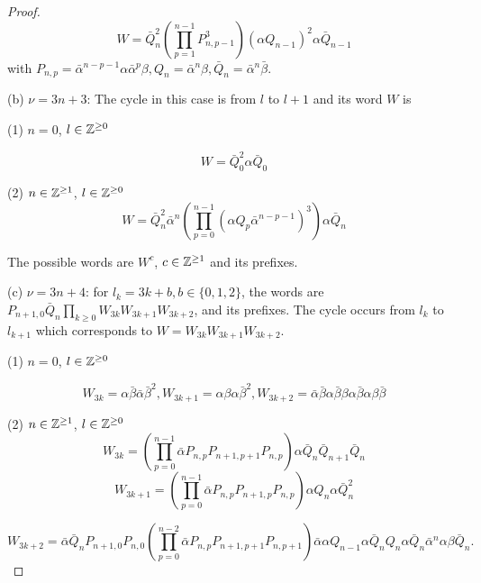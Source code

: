 \documentclass{birkjour_t2}
\theoremstyle{definition}
\theoremstyle{remark}
\numberwithin{equation}{section}
\begin{document}
\begin{proof}
  \begin{equation} 
 W=\bar{Q}_{n}^{2}\left(\prod^{n-1} _{p=1}P_{n, p-1}^{3}\right) (\alpha Q_{n-1})^{2} \alpha \bar{Q}_{n-1}
           \end{equation} 
with $P_{n,p}=\bar{\alpha}^{n-p-1}\alpha \bar{\alpha}^{p} \beta, Q_{n}= \bar{\alpha}^{n}\beta, \bar{Q}_{n}= \bar{\alpha}^{n}\bar{\beta}$.
     \bigskip\par 
 
(b) $\nu= 3n+3$: The cycle in this case is from $l$ to $l+1$ and its word $W$ is 
      \bigskip\par 
(1) $n =0$, $l \in  {\Bbb{Z}}^{\geq 0}$

      \begin{equation} 
W=  \bar{Q}_{0}^{2}  \alpha \bar{Q}_{0}
          \end{equation}  

(2) $n \in  {\Bbb{Z}}^{\geq 1}$, $l \in  {\Bbb{Z}}^{\geq 0}$
      \begin{equation} 
W=  \bar{Q}_{n}^{2} \bar\alpha^{n} \left( \prod^{n-1} _{p=0}( \alpha {Q}_{p } \bar\alpha^{n-p -1})^{3}\right) \alpha  \bar{Q}_{n}
          \end{equation}  

 The possible words are $W^{c}$, $c \in  {\Bbb{Z}}^{\geq 1}$ and its prefixes.
      \bigskip\par 

(c) $\nu= 3n+4$:  for $l_{k}=3k+b, b\in \{ 0, 1, 2 \}$, the  words  are  $P_{n+1,0} \bar{Q}_{n} \prod _{k \geq 0} W_{3k}W_{3k+1}W_{3k+2}$, and its prefixes. The cycle occurs from $l_{k}$ to $l_{k+1}$ which corresponds to  $W=W_{3k}W_{3k+1}W_{3k+2}$.
      \bigskip\par 
(1) $n =0$, $l \in  {\Bbb{Z}}^{\geq 0}$

   \begin{equation} 
  W_{3k}=\alpha\bar{\beta}\bar{\alpha}\bar{\beta}^2, W_{3k+1}=\alpha\beta\alpha\bar{\beta}^2, W_{3k+2}=\bar{\alpha}\bar{\beta}\alpha\bar{\beta}\beta\alpha\bar{\beta}\alpha\beta\bar{\beta}
           \end{equation} 

(2) $n \in  {\Bbb{Z}}^{\geq 1}$, $l \in  {\Bbb{Z}}^{\geq 0}$
    \begin{equation} 
  W_{3k}=\left(\prod^{n-1} _{p=0} \bar{\alpha}P_{n,p}P_{n+1,p+1}P_{n,p}\right)\alpha\bar{Q}_{n}\bar{Q}_{n+1} \bar{Q}_{n}  
           \end{equation} 
  \begin{equation} 
W_{3k+1}=\left(\prod^{n-1} _{p=0} \bar{\alpha}P_{n,p}P_{n+1,p}P_{n,p}\right)\alpha Q_{n}  \alpha  \bar{Q}_{n}^{2}
         \end{equation}  
  
      \begin{equation} 
    W_{3k+2}=\bar{\alpha}  \bar{Q}_{n} P_{n+1,0}P_{n,0}\left(\prod^{n-2} _{p=0} \bar{\alpha}P_{n,p}P_{n+1,p+1}P_{n,p+1}\right)\bar{\alpha} \alpha Q_{n-1} \alpha 
    \bar{Q}_{n}Q_{n}\alpha\bar{Q}_{n}\bar{\alpha}^{n} \alpha \beta \bar{Q}_{n}.
             \end{equation}  
 
  \end{proof}
  
\end{document}
